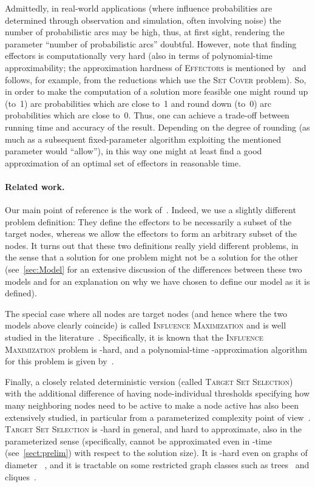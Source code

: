 \documentclass{article}
\newcommand{\probSetCover}{\textsc{Set Cover}\xspace}
\newcommand{\probEffectors}{\textsc{Effectors}\xspace}
\begin{document}
Admittedly, in real-world applications (where influence probabilities
are determined through observation and simulation, often involving noise) 
the number of probabilistic arcs may be high, thus, at first sight,
rendering the parameter ``number of probabilistic arcs'' doubtful.
However, note that finding effectors is computationally very hard
(also in terms of polynomial-time approximability; the approximation hardness of \probEffectors 
is mentioned by~\citet{LTGMH10} and follows, for example, from the reductions which use the \probSetCover problem).
So, in order to make the computation of a solution more feasible one might 
round up (to~1) arc probabilities which are close to~1 and round down (to~0) arc
probabilities which are close to~0. Thus, one can achieve a trade-off between running time and accuracy of the result.
Depending on the degree of rounding 
(as much as a subsequent fixed-parameter algorithm exploiting 
the mentioned parameter would ``allow''),
in this way one might at least find
a good approximation of an optimal set of effectors in reasonable time.


\paragraph{Related work.}
Our main point of reference is the work of~\citet{LTGMH10}.
Indeed, we use a slightly different problem definition:
They define the effectors to be necessarily a subset of the target nodes, 
whereas we allow the effectors to form an arbitrary
subset of the nodes. It turns out that these two definitions really
yield different problems, in the sense that a solution for one problem might not be a solution for the other
(see~\autoref{sec:Model} for an extensive discussion of the differences between these two models
and for an explanation on why we have chosen to define our model as it is defined).


The special case where all nodes are target nodes 
(and hence where the two models above clearly coincide) is
called \textsc{Influence Maximization} and is well studied in the
literature~\cite{BSKDSM07, DPRM01, KKT15}.
Specifically,
it is known that the \textsc{Influence Maximization} problem is -hard,
and a polynomial-time -approximation algorithm for this problem is given by~\citet{KKT15}.


Finally, a closely related deterministic version (called
\textsc{Target Set Selection}) with the 
additional difference of having node-individual 
thresholds specifying how many neighboring nodes need to be active 
to make a node active has also been extensively studied,
in particular from a parameterized complexity point of 
view~\cite{BCNS14-comp,BCNS14-jda,Ben-ZwiHLN11,CNNW14,NNUW13}.
\textsc{Target Set Selection} is -hard in general,
and hard to approximate, also in the parameterized sense
(specifically,
cannot be approximated even in -time (see~\autoref{sect:prelim}) with respect to the solution size).
It is -hard even on graphs of diameter ~\cite{NNUW13},
and it is tractable on some restricted graph classes such as trees~\cite{Ben-ZwiHLN11} and cliques~\cite{NNUW13}.
\end{document}
